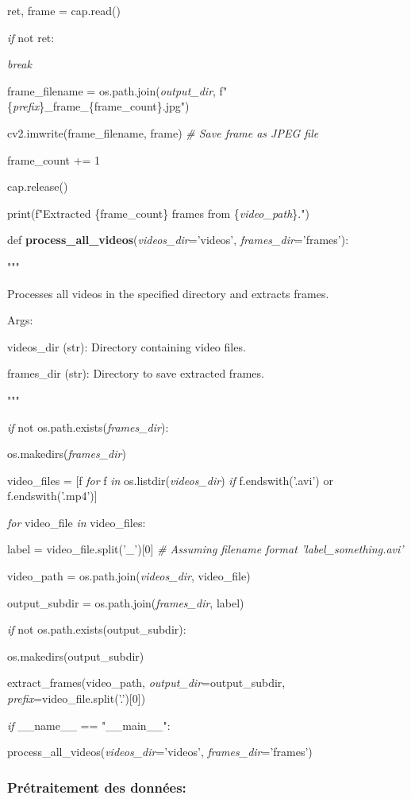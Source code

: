 \documentclass[
]{article}
\begin{document}
ret, frame = cap.read()

\emph{if} not ret:

\emph{break}

frame\_filename = os.path.join(\emph{output\_dir}, f"\{\emph{prefix}\}\_frame\_\{frame\_count\}.jpg")

cv2.imwrite(frame\_filename, frame) \emph{\# Save frame as JPEG file}

frame\_count += 1

cap.release()

print(f"Extracted \{frame\_count\} frames from \{\emph{video\_path}\}.")

def \textbf{process\_all\_videos}(\emph{videos\_dir}='videos', \emph{frames\_dir}='frames'):

"""

Processes all videos in the specified directory and extracts frames.

Args:

videos\_dir (str): Directory containing video files.

frames\_dir (str): Directory to save extracted frames.

"""

\emph{if} not os.path.exists(\emph{frames\_dir}):

os.makedirs(\emph{frames\_dir})

video\_files = {[}f \emph{for} f \emph{in} os.listdir(\emph{videos\_dir}) \emph{if} f.endswith('.avi') or f.endswith('.mp4'){]}

\emph{for} video\_file \emph{in} video\_files:

label = video\_file.split('\_'){[}0{]} \emph{\# Assuming filename format 'label\_something.avi'}

video\_path = os.path.join(\emph{videos\_dir}, video\_file)

output\_subdir = os.path.join(\emph{frames\_dir}, label)

\emph{if} not os.path.exists(output\_subdir):

os.makedirs(output\_subdir)

extract\_frames(video\_path, \emph{output\_dir}=output\_subdir, \emph{prefix}=video\_file.split('.'){[}0{]})

\emph{if} \_\_name\_\_ == "\_\_main\_\_":

process\_all\_videos(\emph{videos\_dir}='videos', \emph{frames\_dir}='frames')

\hypertarget{pruxe9traitement-des-donnuxe9es}{%
\subsubsection{Prétraitement des données:}\label{pruxe9traitement-des-donnuxe9es}}
\end{document}
